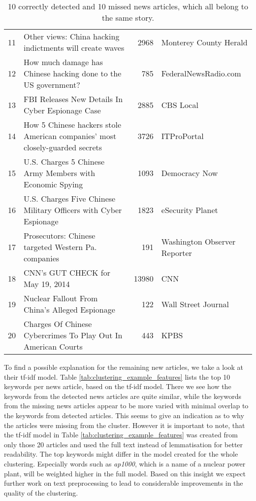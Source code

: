 \begin{table}[h]
{\begin{tabular}{rlrl}
            \hline
                11 & Other views: China hacking indictments will create waves                     &          2968 & Monterey County Herald       \\
                12 & How much damage has Chinese hacking done to the US government?               &           785 & FederalNewsRadio.com         \\
                13 & FBI Releases New Details In Cyber Espionage Case                             &          2885 & CBS Local                    \\
                14 & How 5 Chinese hackers stole American companies' most closely-guarded secrets &          3726 & ITProPortal                  \\
                15 & U.S. Charges 5 Chinese Army Members with Economic Spying                     &          1093 & Democracy Now                \\
                16 & U.S. Charges Five Chinese Military Officers with Cyber Espionage             &          1823 & eSecurity Planet             \\
                17 & Prosecutors: Chinese targeted Western Pa. companies                          &           191 & Washington Observer Reporter \\
                18 & CNN's GUT CHECK for May 19, 2014                                             &         13980 & CNN                  \\
                19 & Nuclear Fallout From China's Alleged Espionage                               &           122 & Wall Street Journal \\
                20 & Charges Of Chinese Cybercrimes To Play Out In American Courts                &           443 & KPBS               \\
                \hline
        \end{tabular}
    }
    \caption{10 correctly detected and 10 missed news articles, which all belong to the same story.}
    \label{tab:clustering_example}
\end{table}

To find a possible explanation for the remaining new articles, we take a look at their tf-idf model.
Table \ref{tab:clustering_example_features} lists the top 10 keywords per news article, based on the tf-idf model.
There we see how the keywords from the detected news articles are quite similar,
while the keywords from the missing news articles appear to be more varied with minimal overlap to the keywords from detected articles.
This seems to give an indication as to why the articles were missing from the cluster.
However it is important to note, that the tf-idf model in Table \ref{tab:clustering_example_features} was created from only those 20 articles
and used the full text instead of lemmatisation for better readability.
The top keywords might differ in the model created for the whole clustering.
Especially words such as \textit{ap1000}, which is a name of a nuclear power plant, will be weighted higher in the full model.
Based on this insight we expect further work on text preprocessing to lead to considerable improvements in the quality of the clustering.

